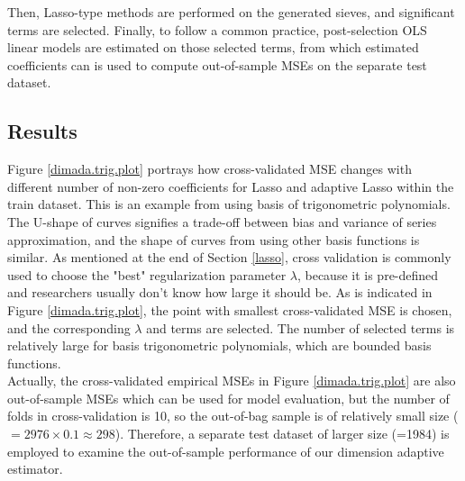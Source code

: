 \documentclass[12pt, a4paper]{article}
\theoremstyle{MAstyle} \newtheorem{assumption}{Assumption}[section]
\theoremstyle{MAstyle} \newtheorem{definition}{Definition}[section]
\theoremstyle{MAstyle} \newtheorem{theorem}{Theorem}[section]
\theoremstyle{MAstyle} \newtheorem{corollary}{Corollary}[section]
\begin{document}
            Then, Lasso-type methods are performed on the generated sieves, and significant terms are selected. Finally, to follow a common practice, post-selection OLS linear models are estimated on those selected terms, from which estimated coefficients can is used to compute out-of-sample MSEs on the separate test dataset.

            \subsection{Results}
            Figure \ref{dimada.trig.plot} portrays how cross-validated MSE changes with different number of non-zero coefficients for Lasso and adaptive Lasso within the train dataset. This is an example from using basis of trigonometric polynomials. The U-shape of curves signifies a trade-off between bias and variance of series approximation, and the shape of curves from using other basis functions is similar. As mentioned at the end of Section \ref{lasso}, cross validation is commonly used to choose the "best" regularization parameter $\lambda$, because it is pre-defined and researchers usually don't know how large it should be. As is indicated in Figure \ref{dimada.trig.plot}, the point with smallest cross-validated MSE is chosen, and the corresponding $\lambda$ and terms are selected. The number of selected terms is relatively large for basis trigonometric polynomials, which are bounded basis functions. \\

            Actually, the cross-validated empirical MSEs in Figure  \ref{dimada.trig.plot} are also out-of-sample MSEs which can be used for model evaluation, but the number of folds in cross-validation is 10, so the out-of-bag sample is of relatively small size ($=2976\times 0.1 \approx 298$). Therefore, a separate test dataset of larger size (=1984) is employed to examine the out-of-sample performance of our dimension adaptive estimator. 
\end{document}

